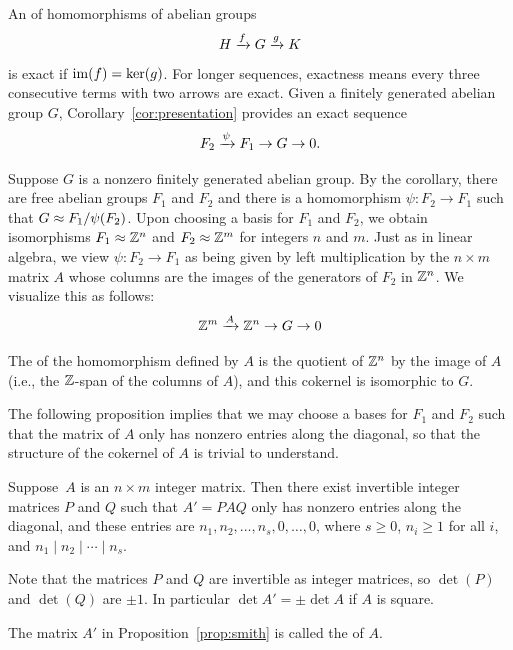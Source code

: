 An  of homomorphisms of abelian groups
$$
	H \xrightarrow{f} G \xrightarrow{g} K
$$
is exact if $\operatorname{im}(f) = \ker(g)$.
For longer sequences, exactness means every three consecutive
terms with two arrows are exact.
Given a finitely generated abelian group $G$,
Corollary~\ref{cor:presentation} provides an exact sequence
$$
	F_2 \xrightarrow{\psi} F_1 \to G \to 0.
$$

Suppose $G$ is a nonzero finitely generated abelian group.  By the
corollary, there are free abelian groups $F_1$ and $F_2$ and there is a
homomorphism $\psi:F_2 \to F_1$ such that $G\approx F_1/\psi(F_2)$.
Upon choosing a basis for $F_1$ and $F_2$, we obtain isomorphisms
$F_1\approx \mathbb{Z}^n$ and $F_2\approx \mathbb{Z}^m$ for integers $n$ and $m$.
Just as in linear algebra, we view $\psi:F_2\to F_1$ as being given
by left multiplication by the $n\times m$ matrix $A$ whose columns
are the images of the generators of $F_2$ in $\mathbb{Z}^n$.  We visualize
this as follows:
$$
	\mathbb{Z}^m \xrightarrow{A} \mathbb{Z}^n \to G \to 0
$$

The  of the homomorphism defined by $A$ is the quotient
of $\mathbb{Z}^n$ by the image of $A$ (i.e., the $\mathbb{Z}$-span of the columns of $A$),
and this cokernel is isomorphic to $G$.

The following proposition implies that we may choose a bases for $F_1$
and $F_2$ such that the matrix of $A$ only has nonzero entries along
the diagonal, so that the structure of the cokernel of $A$ is
trivial to understand.

\begin{proposition}
	\label{prop:smith}
	Suppose~$A$ is an $n\times m$ integer matrix.  Then there exist
	invertible integer matrices $P$ and $Q$ such that $A'=PAQ$ only
	has nonzero entries along the diagonal, and these entries are
	$n_1, n_2,\ldots, n_s,0,\ldots,0$, where
	$s\geq 0$, $n_i\geq 1$ for all $i$, and $n_1\mid n_2 \mid{} \cdots \mid{} n_s$.
\end{proposition}

\begin{remark}
	Note that the matrices $P$ and $Q$ are invertible as integer
	matrices, so $\det(P)$ and $\det(Q)$ are $\pm 1$. In particular
	$\det A' = \pm\det A$ if $A$ is square.
\end{remark}

\begin{definition}
	The matrix $A'$ in Proposition~\ref{prop:smith}
	is called the  of $A$.
\end{definition}

